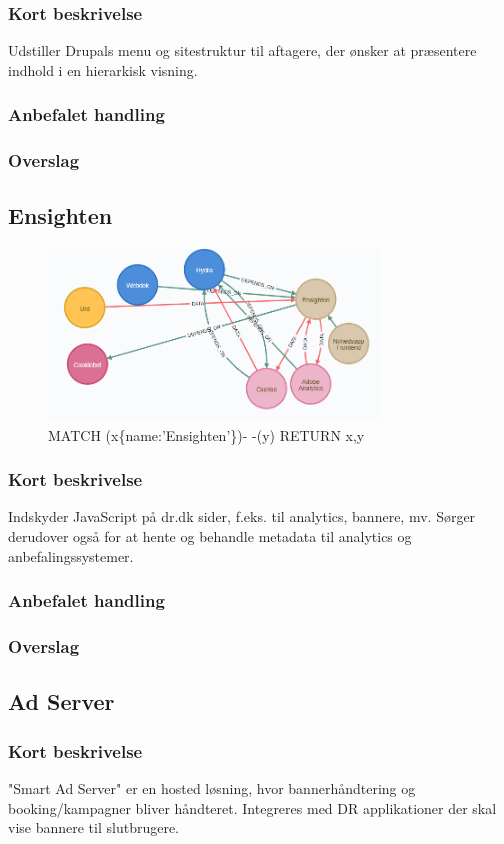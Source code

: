 \documentclass{article}
\begin{document}
\subsubsection{Kort beskrivelse}
Udstiller Drupals menu og sitestruktur til aftagere, der ønsker at præsentere indhold i en hierarkisk visning.
\subsubsection{Anbefalet handling}
\subsubsection{Overslag}


\subsection{Ensighten}
\begin{figure}[h]
\includegraphics[width=250pt]{Ensighten.PNG}
\caption{MATCH (x\{name:'Ensighten'\})- -(y) RETURN x,y}
\end{figure}
\subsubsection{Kort beskrivelse}
Indskyder JavaScript på dr.dk sider, f.eks. til analytics, bannere, mv. Sørger derudover også for at hente og behandle metadata til analytics og anbefalingssystemer.
\subsubsection{Anbefalet handling}
\subsubsection{Overslag}


\subsection{Ad Server}
\subsubsection{Kort beskrivelse}
"Smart Ad Server" er en hosted løsning, hvor bannerhåndtering og booking/kampagner bliver håndteret. Integreres med DR applikationer der skal vise bannere til slutbrugere.
\end{document}
